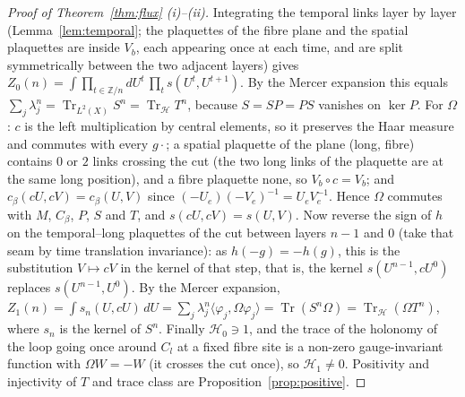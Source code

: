 \documentclass[11pt,a4paper]{article}
\theoremstyle{plain}
\theoremstyle{definition}
\theoremstyle{remark}
\numberwithin{equation}{section}
\newcommand{\Z}{\mathbb{Z}}
\newcommand{\Tr}{\operatorname{Tr}}
\begin{document}
\begin{proof}[Proof of Theorem~\ref{thm:flux} (i)--(ii)]
Integrating the temporal links layer by layer (Lemma~\ref{lem:temporal}; the plaquettes of the fibre plane and the spatial plaquettes are inside $V_b$, each appearing once at each time, and are split symmetrically between the two adjacent layers) gives $Z_0(n)=\int\prod_{t\in\Z/n}dU^t\,\prod_ts(U^t,U^{t+1})$. By the Mercer expansion this equals $\sum_j\lambda_j^n=\Tr_{L^2(X)}S^n=\Tr_{\mathcal H}T^n$, because $S=SP=PS$ vanishes on $\ker P$. For $\Omega$: $c$ is the left multiplication by central elements, so it preserves the Haar measure and commutes with every $g\cdot$; a spatial plaquette of the plane (long, fibre) contains $0$ or $2$ links crossing the cut (the two long links of the plaquette are at the same long position), and a fibre plaquette none, so $V_b\circ c=V_b$; and $c_\beta(cU,cV)=c_\beta(U,V)$ since $(-U_e)(-V_e)^{-1}=U_eV_e^{-1}$. Hence $\Omega$ commutes with $M$, $C_\beta$, $P$, $S$ and $T$, and $s(cU,cV)=s(U,V)$. Now reverse the sign of $h$ on the temporal--long plaquettes of the cut between layers $n{-}1$ and $0$ (take that seam by time translation invariance): as $h(-g)=-h(g)$, this is the substitution $V\mapsto cV$ in the kernel of that step, that is, the kernel $s(U^{n-1},cU^0)$ replaces $s(U^{n-1},U^0)$. By the Mercer expansion, $Z_1(n)=\int s_{n}(U,cU)\,dU=\sum_j\lambda_j^n\langle\varphi_j,\Omega\varphi_j\rangle=\Tr(S^n\Omega)=\Tr_{\mathcal H}(\Omega T^n)$, where $s_n$ is the kernel of $S^n$. Finally $\mathcal H_0\ni1$, and the trace of the holonomy of the loop going once around $C_l$ at a fixed fibre site is a non-zero gauge-invariant function with $\Omega W=-W$ (it crosses the cut once), so $\mathcal H_1\ne0$. Positivity and injectivity of $T$ and trace class are Proposition~\ref{prop:positive}.
\end{proof}
\end{document}
